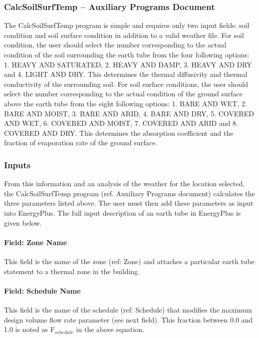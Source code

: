 \subsubsection{CalcSoilSurfTemp -- Auxiliary Programs Document}\label{calcsoilsurftemp-auxiliary-programs-document}

The CalcSoilSurfTemp program is simple and requires only two input fields: soil condition and soil surface condition in addition to a valid weather file. For soil condition, the user should select the number corresponding to the actual condition of the soil surrounding the earth tube from the four following options: 1. HEAVY AND SATURATED, 2. HEAVY AND DAMP, 3. HEAVY AND DRY and 4. LIGHT AND DRY. This determines the thermal diffusivity and thermal conductivity of the surrounding soil. For soil surface conditions, the user should select the number corresponding to the actual condition of the ground surface above the earth tube from the eight following options: 1. BARE AND WET, 2. BARE AND MOIST, 3. BARE AND ARID, 4. BARE AND DRY, 5. COVERED AND WET, 6. COVERED AND MOIST, 7. COVERED AND ARID and 8. COVERED AND DRY. This determines the absorption coefficient and the fraction of evaporation rate of the ground surface.

\subsubsection{Inputs}
From this information and an analysis of the weather for the location selected, the CalcSoilSurfTemp program (ref. Auxiliary Programs document) calculates the three parameters listed above. The user must then add these parameters as input into EnergyPlus. The full input description of an earth tube in EnergyPlus is given below.

\paragraph{Field: Zone Name}\label{field-zone-name-5}

This field is the name of the zone (ref: Zone) and attaches a particular earth tube statement to a thermal zone in the building.

\paragraph{Field: Schedule Name}\label{field-schedule-name-6}

This field is the name of the schedule (ref: Schedule) that modifies the maximum design volume flow rate parameter (see next field). This fraction between 0.0 and 1.0 is noted as F\(_{schedule}\) in the above equation.

